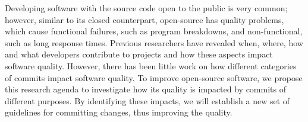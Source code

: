 Developing software with the source code open to the public is very common; however, similar to its closed counterpart, open-source has quality problems, which cause functional failures, such as program breakdowns, and non-functional, such as long response times.
Previous researchers have revealed when, where, how and what developers contribute to projects and how these aspects impact software quality. 
However, there has been little work on how different categories of commits impact software quality.
To improve open-source software, we propose this research agenda to investigate how its quality is impacted by commits of different purposes.
By identifying these impacts, we will establish a new set of guidelines for committing changes, thus improving the quality.
